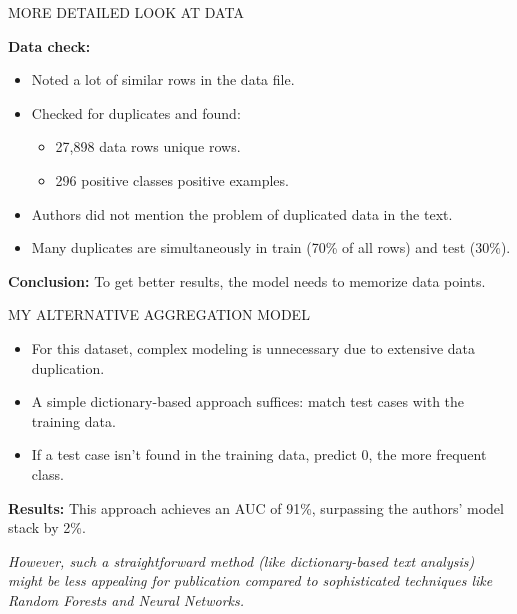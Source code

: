 \documentclass[11pt, aspectratio=169]{beamer}
\begin{document}
\begin{frame}{\MakeUppercase{More detailed look at data}}

    \textbf{Data check:}
    \begin{itemize}
        \item Noted a lot of similar rows in the data file.
        \item Checked for duplicates and found:
        \begin{itemize}
            \item 27,898 data rows  unique rows.
            \item 296 positive classes  positive examples.
        \end{itemize}
        \item Authors did not mention the problem of duplicated data in the text.
        \item Many duplicates are simultaneously in train (70\% of all rows) and test (30\%).
    \end{itemize}

    \textbf{Conclusion:} To get better results, the model needs to memorize data points.

\end{frame}

\begin{frame}{\MakeUppercase{My alternative aggregation model}}
    \begin{itemize}
        \itemsep1em
        \item For this dataset, complex modeling is unnecessary due to extensive data duplication.
        \item A simple dictionary-based approach suffices: match test cases with the training data.
        \item If a test case isn't found in the training data, predict 0, the more frequent class.
    \end{itemize}

    \vspace{0.5cm} %

    \textbf{Results:} This approach achieves an AUC of 91\%, surpassing the authors' model stack by 2\%.

    \vspace{0.5cm} %

    \textit{However, such a straightforward method (like dictionary-based text analysis) might be less appealing for publication compared to sophisticated techniques like Random Forests and Neural Networks.}
\end{frame}
\end{document}
